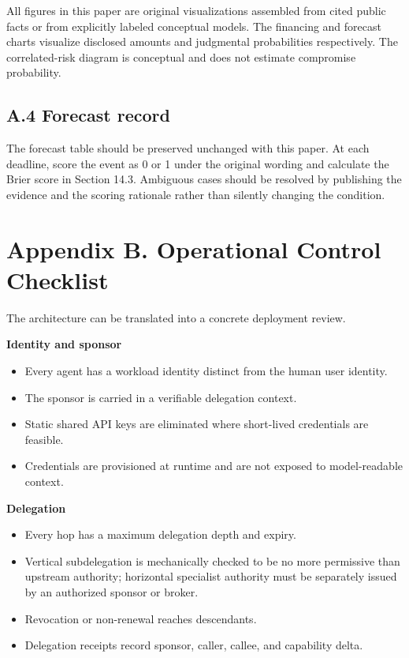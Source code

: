 \documentclass[
  10pt,
  letterpaper,
]{article}
\providecommand{\tightlist}{%
  \setlength{\itemsep}{0pt}\setlength{\parskip}{0pt}}
\begin{document}
All figures in this paper are original visualizations assembled from
cited public facts or from explicitly labeled conceptual models. The
financing and forecast charts visualize disclosed amounts and judgmental
probabilities respectively. The correlated-risk diagram is conceptual
and does not estimate compromise probability.

\subsection{A.4 Forecast record}\label{a.4-forecast-record}

The forecast table should be preserved unchanged with this paper. At
each deadline, score the event as 0 or 1 under the original wording and
calculate the Brier score in Section 14.3. Ambiguous cases should be
resolved by publishing the evidence and the scoring rationale rather
than silently changing the condition.

\section{Appendix B. Operational Control
Checklist}\label{appendix-b.-operational-control-checklist}

The architecture can be translated into a concrete deployment review.

\textbf{Identity and sponsor}

\begin{itemize}
\tightlist
\item
  Every agent has a workload identity distinct from the human user
  identity.
\item
  The sponsor is carried in a verifiable delegation context.
\item
  Static shared API keys are eliminated where short-lived credentials
  are feasible.
\item
  Credentials are provisioned at runtime and are not exposed to
  model-readable context.
\end{itemize}

\textbf{Delegation}

\begin{itemize}
\tightlist
\item
  Every hop has a maximum delegation depth and expiry.
\item
  Vertical subdelegation is mechanically checked to be no more
  permissive than upstream authority; horizontal specialist authority
  must be separately issued by an authorized sponsor or broker.
\item
  Revocation or non-renewal reaches descendants.
\item
  Delegation receipts record sponsor, caller, callee, and capability
  delta.
\end{itemize}
\end{document}
